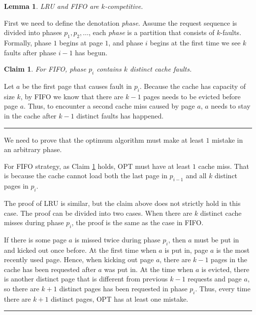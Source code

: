 \documentclass[11pt]{article}
\newenvironment{proof}{{\bf Proof:  }}{\hfill\rule{2mm}{2mm}}
\newenvironment{proofof}[1]{{\bf Proof of #1:  }}{\hfill\rule{2mm}{2mm}}
\newtheorem{lemma}[fact]{Lemma}
\newtheorem{claim}[fact]{Claim}
\begin{document}
\begin{lemma}
	LRU and FIFO are $k$-competitive\cite{sleator1985amortized}.
	\label{lemma1}
\end{lemma}

First we need to define the denotation {\em phase}. Assume the request sequence is divided into phases $p_1, p_2, \dots$, each {\em phase} is a partition that consists of $k$-faults. Formally, phase $1$ begins at page $1$, and phase $i$ begins at the first time we see $k$ faults after phase $i-1$ has begun. 
	
\begin{claim}
	For FIFO, phase $p_i$ contains $k$ distinct cache faults\cite{komm2016introduction}.
	\label{claim1}
\end{claim}

\begin{proof}
	Let $a$ be the first page that causes fault in $p_i$. Because the cache has capacity of size $k$, by FIFO we know that there are $k-1$ pages needs to be evicted before page $a$. Thus, to encounter a second cache miss caused by page $a$, $a$ needs to stay in the cache after $k-1$ distinct faults has happened.
\end{proof}

\begin{proofof}{Lemma \ref{lemma1}}
	We need to prove that the optimum algorithm must make at least $1$ mistake in an arbitrary phase.
	
	For FIFO strategy, as Claim \ref{claim1} holds, OPT must have at least $1$ cache miss. That is because the cache cannot load both the last page in $p_{i-1}$ and all $k$ distinct pages in $p_i$.
	
	The proof of LRU is similar, but the claim above does not strictly hold in this case. The proof can be divided into two cases. When there are $k$ distinct cache misses during phase $p_i$, the proof is the same as the case in FIFO.
	
	If there is some page $a$ is missed twice during phase $p_i$, then $a$ must be put in and kicked out once before. At the first time when $a$ is put in, page $a$ is the most recently used page. Hence, when kicking out page $a$, there are $k-1$ pages in the cache has been requested after $a$ was put in. At the time when $a$ is evicted, there is another distinct page that is different from previous $k-1$ requests and page $a$, so there are $k+1$ distinct pages has been requested in phase $p_i$. Thus, every time there are $k+1$ distinct pages, OPT has at least one mistake.
\end{proofof}
\end{document}
